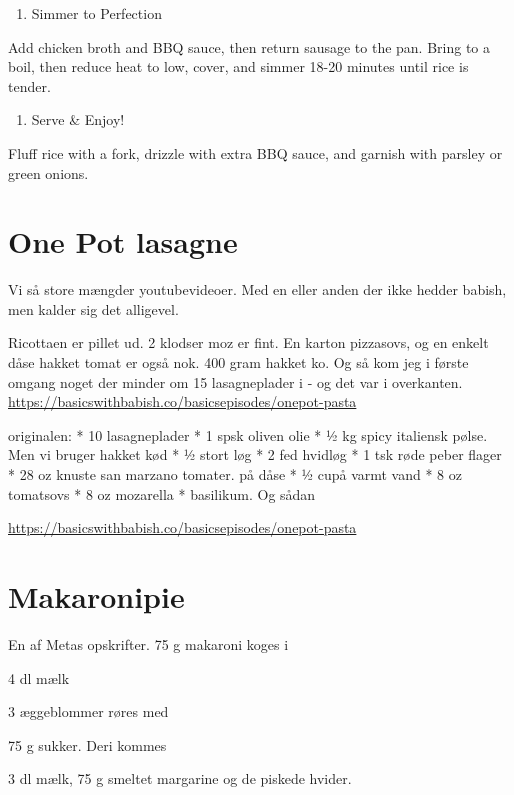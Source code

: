 \documentclass[
]{book}
\providecommand{\tightlist}{%
  \setlength{\itemsep}{0pt}\setlength{\parskip}{0pt}}
\begin{document}
\begin{enumerate}
\def\labelenumi{\arabic{enumi}.}
\setcounter{enumi}{3}
\tightlist
\item
  Simmer to Perfection
\end{enumerate}

Add chicken broth and BBQ sauce, then return sausage to the pan.
Bring to a boil, then reduce heat to low, cover, and simmer 18-20 minutes until rice is tender.

\begin{enumerate}
\def\labelenumi{\arabic{enumi}.}
\setcounter{enumi}{4}
\tightlist
\item
  Serve \& Enjoy!
\end{enumerate}

Fluff rice with a fork, drizzle with extra BBQ sauce, and garnish with parsley or green onions.

\section{One Pot lasagne}\label{one-pot-lasagne-1}

Vi så store mængder youtubevideoer. Med en eller anden der ikke hedder babish, men kalder sig det alligevel.

Ricottaen er pillet ud. 2 klodser moz er fint. En karton pizzasovs, og en enkelt dåse hakket tomat er også nok.
400 gram hakket ko.
Og så kom jeg i første omgang noget der minder om 15 lasagneplader i - og det var i overkanten.
\url{https://basicswithbabish.co/basicsepisodes/onepot-pasta}

originalen:
* 10 lasagneplader
* 1 spsk oliven olie
* ½ kg spicy italiensk pølse. Men vi bruger hakket kød
* ½ stort løg
* 2 fed hvidløg
* 1 tsk røde peber flager
* 28 oz knuste san marzano tomater. på dåse
* ½ cupå varmt vand
* 8 oz tomatsovs
* 8 oz mozarella
* basilikum. Og sådan

\url{https://basicswithbabish.co/basicsepisodes/onepot-pasta}

\section{Makaronipie}\label{makaronipie}

En af Metas opskrifter.
75 g makaroni koges i

4 dl mælk

3 æggeblommer røres med

75 g sukker. Deri kommes

3 dl mælk, 75 g smeltet margarine og de piskede hvider.
\end{document}
